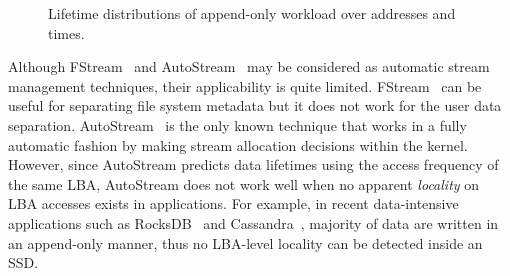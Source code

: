 \begin{figure}[t]
	\centering

	\hfill

	\vspace{-10pt}
	\hspace{10pt}
	\vspace{-3pt}
	\caption{Lifetime distributions of append-only workload over addresses and times.} %
	\label{fig:lba_lifetime}
	\vspace{-20pt}
\end{figure}


Although \textsf{\small FStream}~\cite{FStream} and \textsf{\small AutoStream}~\cite{AutoStream}
may be considered 
as automatic stream management techniques,
their applicability is quite limited.
\textsf{\small FStream}~\cite{FStream} can be useful for separating file system metadata but it does not
work for the user data separation.
\textsf{\small AutoStream}~\cite{AutoStream} is the only known technique that works in a 
fully automatic fashion by making stream allocation decisions within 
the kernel.
However, since \textsf{\small AutoStream} predicts data lifetimes using the
access frequency of the same LBA, \textsf{\small AutoStream} does not work well 
when no apparent {\it locality} on LBA accesses exists in applications.  
For example, in recent data-intensive applications 
such as RocksDB~\cite{RocksDB} and Cassandra~\cite{Cassandra}, 
majority of data are written in an append-only manner,
thus no LBA-level locality can be detected inside an SSD.

